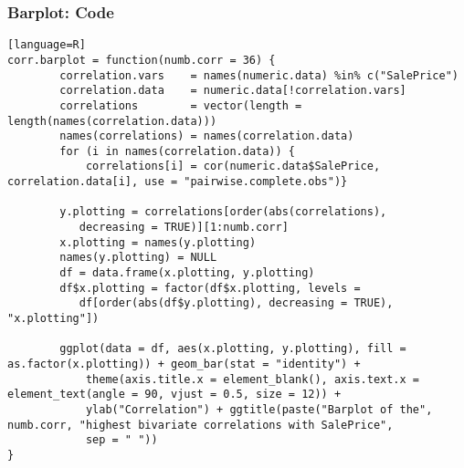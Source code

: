 \begin{frame}[fragile]
\frametitle{Barplot: Code}

\begin{lstlisting}[basicstyle=\tiny][language=R]
corr.barplot = function(numb.corr = 36) {
        correlation.vars    = names(numeric.data) %in% c("SalePrice")
        correlation.data    = numeric.data[!correlation.vars]                  
        correlations        = vector(length = 										length(names(correlation.data)))
        names(correlations) = names(correlation.data)        
        for (i in names(correlation.data)) {                                   
            correlations[i] = cor(numeric.data$SalePrice, 							correlation.data[i], use = "pairwise.complete.obs")}        
        
        y.plotting = correlations[order(abs(correlations), 
           decreasing = TRUE)][1:numb.corr]
        x.plotting = names(y.plotting)
        names(y.plotting) = NULL
        df = data.frame(x.plotting, y.plotting)
        df$x.plotting = factor(df$x.plotting, levels = 
           df[order(abs(df$y.plotting), decreasing = TRUE), "x.plotting"])
        
        ggplot(data = df, aes(x.plotting, y.plotting), fill = as.factor(x.plotting)) + geom_bar(stat = "identity") + 
            theme(axis.title.x = element_blank(), axis.text.x = element_text(angle = 90, vjust = 0.5, size = 12)) + 
            ylab("Correlation") + ggtitle(paste("Barplot of the", numb.corr, "highest bivariate correlations with SalePrice", 
            sep = " "))
}

\end{lstlisting}

\end{frame}



